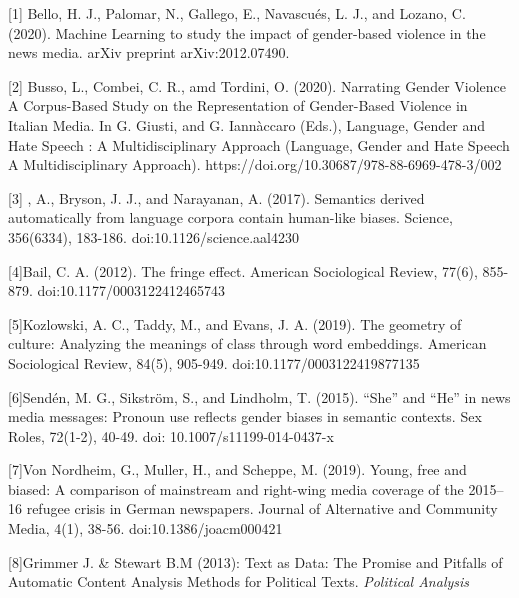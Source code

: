\documentclass{article}
\begin{document}
[1] Bello, H. J., Palomar, N., Gallego, E., Navascués, L. J., and Lozano, C. (2020). Machine Learning to study the impact of gender-based violence in the news media. arXiv preprint arXiv:2012.07490.

[2] Busso, L., Combei, C. R., amd Tordini, O. (2020). Narrating Gender Violence A Corpus-Based Study on the Representation of Gender-Based Violence in Italian Media. In G. Giusti, and G. Iannàccaro (Eds.), Language, Gender and Hate Speech : A Multidisciplinary Approach (Language, Gender and Hate Speech A Multidisciplinary Approach). https://doi.org/10.30687/978-88-6969-478-3/002

[3] , A., Bryson, J. J., and Narayanan, A. (2017). Semantics derived automatically from language corpora contain human-like biases. Science, 356(6334), 183-186. doi:10.1126/science.aal4230

[4]Bail, C. A. (2012). The fringe effect. American Sociological Review, 77(6), 855-879. doi:10.1177/0003122412465743

[5]Kozlowski, A. C., Taddy, M., and Evans, J. A. (2019). The geometry of culture: Analyzing the meanings of class through word embeddings. American Sociological Review, 84(5), 905-949. doi:10.1177/0003122419877135

[6]Sendén, M. G., Sikström, S., and Lindholm, T. (2015). “She” and “He” in news media messages: Pronoun use reflects gender biases in semantic contexts. Sex Roles, 72(1-2), 40-49. doi: 10.1007/s11199-014-0437-x

[7]Von Nordheim, G., Muller, H., and Scheppe, M. (2019). Young, free and biased: A comparison of mainstream and right-wing media coverage of the 2015–16 refugee crisis in German newspapers. Journal of Alternative and Community Media, 4(1), 38-56. doi:10.1386/joacm000421
 
[8]Grimmer J. \& Stewart B.M (2013): Text as Data: The Promise and Pitfalls of Automatic Content Analysis Methods for Political Texts. 
{\it Political Analysis}

\newpage
\pagebreak
\end{document}
